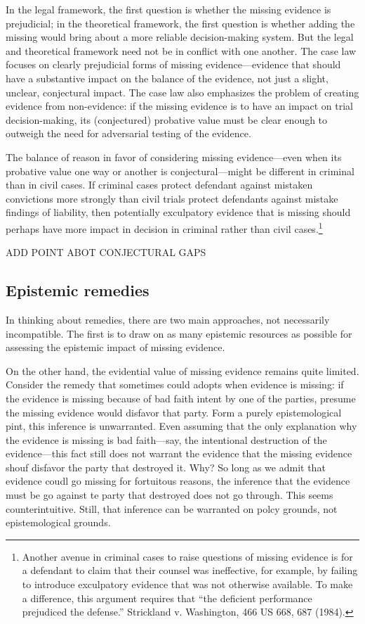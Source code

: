 \documentclass[
  10pt,
  dvipsnames,enabledeprecatedfontcommands]{scrartcl}
\begin{document}
In the legal framework, the first question is whether the missing
evidence is prejudicial; in the theoretical framework, the first
question is whether adding the missing would bring about a more reliable
decision-making system. But the legal and theoretical framework need not
be in conflict with one another. The case law focuses on clearly
prejudicial forms of missing evidence---evidence that should have a
substantive impact on the balance of the evidence, not just a slight,
unclear, conjectural impact. The case law also emphasizes the problem of
creating evidence from non-evidence: if the missing evidence is to have
an impact on trial decision-making, its (conjectured) probative value
must be clear enough to outweigh the need for adversarial testing of the
evidence.

The balance of reason in favor of considering missing evidence---even
when its probative value one way or another is conjectural---might be
different in criminal than in civil cases. If criminal cases protect
defendant against mistaken convictions more strongly than civil trials
protect defendants against mistake findings of liability, then
potentially exculpatory evidence that is missing should perhaps have
more impact in decision in criminal rather than civil cases.\footnote{Another
  avenue in criminal cases to raise questions of missing evidence is for
  a defendant to claim that their counsel was ineffective, for example,
  by failing to introduce exculpatory evidence that was not otherwise
  available. To make a difference, this argument requires that ``the
  deficient performance prejudiced the defense.'' Strickland v.
  Washington, 466 US 668, 687 (1984).}

ADD POINT ABOT CONJECTURAL GAPS

\hypertarget{epistemic-remedies}{%
\subsection{Epistemic remedies}\label{epistemic-remedies}}

In thinking about remedies, there are two main approaches, not
necessarily incompatible. The first is to draw on as many epistemic
resources as possible for assessing the epistemic impact of missing
evidence.

On the other hand, the evidential value of missing evidence remains
quite limited. Consider the remedy that sometimes could adopts when
evidence is missing: if the evidence is missing because of bad faith
intent by one of the parties, presume the missing evidence would
disfavor that party. Form a purely epistemological pint, this inference
is unwarranted. Even assuming that the only explanation why the evidence
is missing is bad faith---say, the intentional destruction of the
evidence---this fact still does not warrant the evidence that the
missing evidence shouf disfavor the party that destroyed it. Why? So
long as we admit that evidence coudl go missing for fortuitous reasons,
the inference that the evidence must be go against te party that
destroyed does not go through. This seems counterintuitive. Still, that
inference can be warranted on polcy grounds, not epistemological
grounds.
\end{document}
